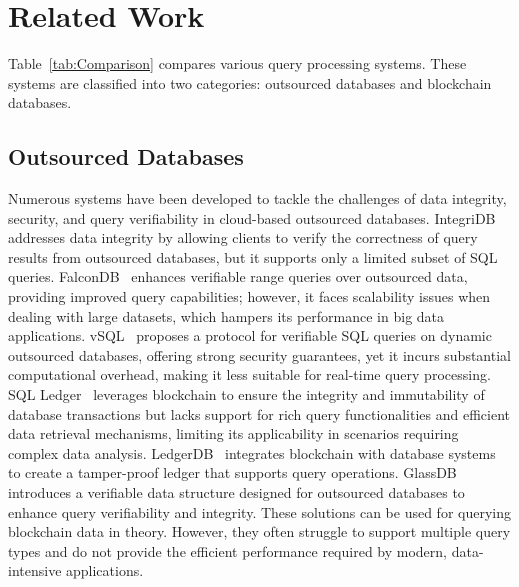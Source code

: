 \section{Related Work}

Table~\ref{tab:Comparison} compares various query processing systems. These systems are classified into two categories: {outsourced databases} and {blockchain databases}.


\subsection{Outsourced Databases}
Numerous systems have been developed to tackle the challenges of data integrity, security, and query verifiability in cloud-based outsourced databases. IntegriDB~\cite{zhang2015integridb} addresses data integrity by allowing clients to verify the correctness of query results from outsourced databases, but it supports only a limited subset of SQL queries. FalconDB~\cite{peng2020falcondb} enhances verifiable range queries over outsourced data, providing improved query capabilities; however, it faces scalability issues when dealing with large datasets, which hampers its performance in big data applications. vSQL~\cite{zhang2017vsql} proposes a protocol for verifiable SQL queries on dynamic outsourced databases, offering strong security guarantees, yet it incurs substantial computational overhead, making it less suitable for real-time query processing. SQL Ledger~\cite{antonopoulos2021sql} leverages blockchain to ensure the integrity and immutability of database transactions but lacks support for rich query functionalities and efficient data retrieval mechanisms, limiting its applicability in scenarios requiring complex data analysis. LedgerDB~\cite{yang2020ledgerdb} integrates blockchain with database systems to create a tamper-proof ledger that supports query operations. GlassDB~\cite{yue2022glassdb} introduces a verifiable data structure designed for outsourced databases to enhance query verifiability and integrity. These solutions can be used for querying blockchain data in theory. However, they often struggle to support multiple query types and do not provide the efficient performance required by modern, data-intensive applications.


